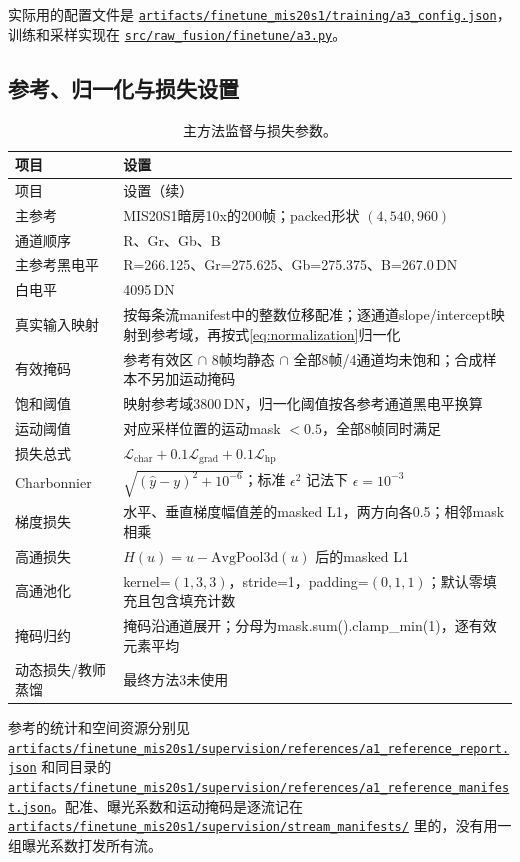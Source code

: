 \documentclass[11pt,a4paper,UTF8,fontset=fandol]{ctexart}
\newcommand{\repofile}[1]{\href{https://github.com/JingZe-Liang/SigmaStar_AIISP/blob/main/Stage2/9_19-10_1/Task3/XWJ/RECOVERED_Stage2_DenoiseModel_20261010/#1}{\nolinkurl{#1}}}
\newcommand{\repodir}[1]{\href{https://github.com/JingZe-Liang/SigmaStar_AIISP/tree/main/Stage2/9_19-10_1/Task3/XWJ/RECOVERED_Stage2_DenoiseModel_20261010/#1}{\nolinkurl{#1}}}
\newcommand{\dn}{\ensuremath{\,\mathrm{DN}}}
\begin{document}
实际用的配置文件是 \repofile{artifacts/finetune_mis20s1/training/a3_config.json}，训练和采样实现在 \repofile{src/raw_fusion/finetune/a3.py}。

\subsection{参考、归一化与损失设置}

\begin{longtable}{P{0.27\textwidth}P{0.65\textwidth}}
\caption{主方法监督与损失参数。}\label{tab:loss_config}\\
\toprule 项目 & 设置 \\ \midrule
\endfirsthead
\toprule 项目 & 设置（续） \\ \midrule
\endhead
\bottomrule\endfoot
主参考 & MIS20S1暗房10x的200帧；packed形状 $(4,540,960)$ \\
通道顺序 & R、Gr、Gb、B \\
主参考黑电平 & R=266.125、Gr=275.625、Gb=275.375、B=267.0\dn \\
白电平 & 4095\dn \\
真实输入映射 & 按每条流manifest中的整数位移配准；逐通道slope/intercept映射到参考域，再按式\eqref{eq:normalization}归一化 \\
有效掩码 & 参考有效区 $\cap$ 8帧均静态 $\cap$ 全部8帧/4通道均未饱和；合成样本不另加运动掩码 \\
饱和阈值 & 映射参考域3800\dn，归一化阈值按各参考通道黑电平换算 \\
运动阈值 & 对应采样位置的运动mask $<0.5$，全部8帧同时满足 \\
损失总式 & $\mathcal L_{\mathrm{char}}+0.1\mathcal L_{\mathrm{grad}}+0.1\mathcal L_{\mathrm{hp}}$ \\
Charbonnier & $\sqrt{(\hat y-y)^2+10^{-6}}$；标准 $\epsilon^2$ 记法下 $\epsilon=10^{-3}$ \\
梯度损失 & 水平、垂直梯度幅值差的masked L1，两方向各0.5；相邻mask相乘 \\
高通损失 & $H(u)=u-\mathrm{AvgPool3d}(u)$ 后的masked L1 \\
高通池化 & kernel=$(1,3,3)$，stride=1，padding=$(0,1,1)$；默认零填充且包含填充计数 \\
掩码归约 & 掩码沿通道展开；分母为mask.sum().clamp\_min(1)，逐有效元素平均 \\
动态损失/教师蒸馏 & 最终方法3未使用 \\
\end{longtable}

参考的统计和空间资源分别见 \repofile{artifacts/finetune_mis20s1/supervision/references/a1_reference_report.json} 和同目录的 \repofile{artifacts/finetune_mis20s1/supervision/references/a1_reference_manifest.json}。配准、曝光系数和运动掩码是逐流记在 \repodir{artifacts/finetune_mis20s1/supervision/stream_manifests/} 里的，没有用一组曝光系数打发所有流。
\end{document}
